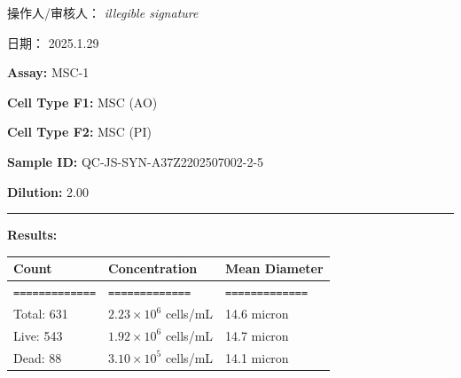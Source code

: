 \documentclass[UTF8,10pt,a4paper,fontset=fandol]{ctexart}
\renewcommand{\arraystretch}{1.15}
\newcommand{\fieldvalue}[1]{#1}
\newcommand{\handwritten}[1]{#1}
\begin{document}
\begin{center}
\begin{center}
\vfill

\noindent 操作人/审核人：
\handwritten{\textit{illegible signature}}

\hfill
日期：
\handwritten{2025.1.29}

\newpage

\noindent\textbf{Assay:} 
\fieldvalue{MSC-1}

\medskip
\noindent\textbf{Cell Type F1:} 
\fieldvalue{MSC (AO)}

\noindent\textbf{Cell Type F2:} 
\fieldvalue{MSC (PI)}

\medskip
\noindent\textbf{Sample ID:} 
\fieldvalue{QC-JS-SYN-A37Z2202507002-2-5}

\noindent\textbf{Dilution:} 
\fieldvalue{2.00}

\medskip
\noindent\rule{\textwidth}{0.4pt}

\noindent\textbf{Results:}

\medskip
\renewcommand{\arraystretch}{1.15}
\begin{tabularx}{\textwidth}{@{}X X X@{}}
\textbf{Count} & \textbf{Concentration} & \textbf{Mean Diameter} \\
\hline
\texttt{=============} & \texttt{=============} & \texttt{=============} \\

Total:
\fieldvalue{631}
&
\fieldvalue{$2.23\times10^{6}$ cells/mL}
&
\fieldvalue{14.6 micron}
\\

Live:
\fieldvalue{543}
&
\fieldvalue{$1.92\times10^{6}$ cells/mL}
&
\fieldvalue{14.7 micron}
\\

Dead:
\fieldvalue{88}
&
\fieldvalue{$3.10\times10^{5}$ cells/mL}
&
\fieldvalue{14.1 micron}
\\
\end{tabularx}


\end{center}
\end{center}
\end{document}
